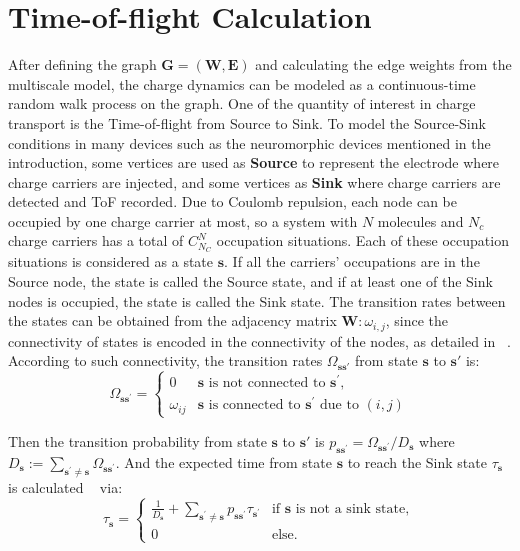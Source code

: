 \documentclass[letterpaper,12pt]{article}
\begin{document}
\section{Time-of-flight Calculation}
After defining the graph $\mathbf{G}=(\mathbf{W},\mathbf{E})$ and calculating the edge weights from the multiscale model, the charge dynamics can be modeled as a continuous-time random walk process on the graph. 
One of the quantity of interest in charge transport is the Time-of-flight from Source to Sink. 
To model the Source-Sink conditions in many devices such as the neuromorphic devices mentioned in the introduction, some vertices are used as \textbf{Source} to represent the electrode where charge carriers are injected, and some vertices as \textbf{Sink} where charge carriers are detected and ToF recorded.
Due to Coulomb repulsion, each node can be occupied by one charge carrier at most, so a system with $N$ molecules and $N_c$ charge carriers has a total of $C^N_{N_C}$ occupation situations. Each of these occupation situations is considered as a state $\mathbf{s}$. 
If all the carriers' occupations are in the Source node, the state is called the Source state, and if at least one of the Sink nodes is occupied, the state is called the Sink state. 
The transition rates between the states can be obtained from the adjacency matrix $\mathbf{W}:\omega_{i,j}$, since the connectivity of states is encoded in the connectivity of the nodes, as detailed in ~\cite{chen_graph_2024}. 
According to such connectivity, 
the transition rates $\Omega_{\mathbf{s} \mathbf{s}' }$ from state $\mathbf{s}$ to $\mathbf{s}'$ is:
\begin{equation}\label{eq:transition_rates}
	\Omega_{\mathbf{s} \mathbf{s}^\prime} =
	\begin{cases}
	     0			&  \mathbf{s} \text{ is not connected to } \mathbf{s}^\prime,\\
	    \omega_{ij}	&  \mathbf{s} \text{ is connected to } \mathbf{s}^\prime \text{ due to } (i,j)
	\end{cases}
\end{equation}

Then the transition probability from state $\mathbf{s}$ to $\mathbf{s}'$ is $p_{\mathbf{s} \mathbf{s}^\prime} = \Omega_{\mathbf{s} \mathbf{s}^\prime}/D_\mathbf{s}$ where $D_\mathbf{s} := \sum_{\mathbf{s}^\prime \ne \mathbf{s}} \Omega_{\mathbf{s} \mathbf{s}^\prime}$.
And the expected time from state $\mathbf{s}$ to reach the Sink state $\tau_\mathbf{s}$ is calculated 
~\cite{chen_graph_2024} via: 
\begin{equation}\label{eq:hitting_time}
	\tau_\mathbf{s} = \begin{cases}
		\frac{1}{D_\mathbf{s}} + \sum_{\mathbf{s}^\prime \ne \mathbf{s}} p_{\mathbf{s} \mathbf{s}^\prime} \tau_{\mathbf{s}^\prime} &\text{if $\mathbf{s}$ is not a sink state},\\
		0 &\text{else.} 
	\end{cases}
\end{equation} 
\end{document}
